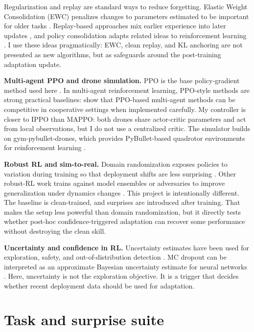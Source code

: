 \documentclass{article}
\begin{document}
Regularization and replay are standard ways to reduce forgetting. Elastic Weight Consolidation (EWC) penalizes changes to parameters estimated to be important for older tasks \citep{kirkpatrick2017overcoming}. Replay-based approaches mix earlier experience into later updates \citep{rolnick2019experience}, and policy consolidation adapts related ideas to reinforcement learning \citep{kaplanis2019policy}. I use these ideas pragmatically: EWC, clean replay, and KL anchoring are not presented as new algorithms, but as safeguards around the post-training adaptation update.

\textbf{Multi-agent PPO and drone simulation.} PPO is the base policy-gradient method used here \citep{schulman2017proximal}. In multi-agent reinforcement learning, PPO-style methods are strong practical baselines: \citet{yu2022surprising} show that PPO-based multi-agent methods can be competitive in cooperative settings when implemented carefully. My controller is closer to IPPO than MAPPO: both drones share actor-critic parameters and act from local observations, but I do not use a centralized critic. The simulator builds on gym-pybullet-drones, which provides PyBullet-based quadrotor environments for reinforcement learning \citep{panerati2021learning}.

\textbf{Robust RL and sim-to-real.} Domain randomization exposes policies to variation during training so that deployment shifts are less surprising \citep{tobin2017domain}. Other robust-RL work trains against model ensembles or adversaries to improve generalization under dynamics changes \citep{rajeswaran2017epopt,pinto2017robust}. This project is intentionally different. The baseline is clean-trained, and surprises are introduced after training. That makes the setup less powerful than domain randomization, but it directly tests whether post-hoc confidence-triggered adaptation can recover some performance without destroying the clean skill.

\textbf{Uncertainty and confidence in RL.} Uncertainty estimates have been used for exploration, safety, and out-of-distribution detection \citep{osband2016deep,lutjens2019safe}. MC dropout can be interpreted as an approximate Bayesian uncertainty estimate for neural networks \citep{gal2016dropout}. Here, uncertainty is not the exploration objective. It is a trigger that decides whether recent deployment data should be used for adaptation.

\section{Task and surprise suite}
\end{document}
